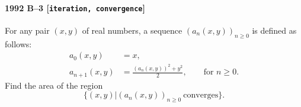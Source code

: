 \paragraph{1992 B--3 \textnormal{[\texttt{iteration, convergence}]}}
For any pair $(x, y)$ of real numbers, a sequence
$(a_n(x,y))_{n\geq 0}$ is defined as follows:
\begin{align*}
a_0(x, y) &= x, \\
a_{n+1}(x, y) &= \frac{(a_n(x, y))^2 + y^2}{2}, \qquad \mbox{for $n \geq 0$}.
\end{align*}
Find the area of the region
\[
\{ (x, y) | (a_n(x, y))_{n \geq 0}\ \mbox{converges}\}.
\]

